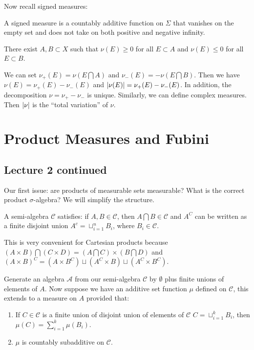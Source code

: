 \documentclass[10pt, twoside]{article}
\begin{document}
    Now recall signed measures:
    \begin{defn}
        A signed measure is a countably additive function on $\Sigma$ that vanishes on the empty set and does not take on both positive and negative infinity.
    \end{defn}

    \begin{lem}
        There exist $A,B \subset X$ such that $\nu(E) \geq 0$ for all $E \subset A$ and $\nu(E) \leq 0$ for all $E \subset B$.
    \end{lem}

    We can set $\nu_+(E) = \nu(E \bigcap A)$ and $\nu_-(E) = -\nu(E \bigcap B)$. Then we have $\nu(E) = \nu_+(E) - \nu_-(E)$ and $\lvert\nu(E)\rvert = \nu_+(E) - \nu_-(E)$. In addition, the decomposition $\nu = \nu_+ - \nu_-$ is unique. Similarly, we can define complex measures. Then $\lvert\nu\rvert$ is the ``total variation'' of $\nu$.

    \section{Product Measures and Fubini}%
    
    \subsection{Lecture 2 continued}%
    Our first issue: are products of measurable sets measurable? What is the correct product $\sigma$-algebra? We will simplify the structure.

    \begin{defn}
        A semi-algebra $\mathcal{C}$ satisfies: if $A,B \in \mathcal{C}$, then $A \bigcap B \in \mathcal{C}$ and $A^C$ can be written as a finite disjoint union $A^c = \sqcup_{i=1}^n B_i$, where $B_i \in \mathcal{C}$.
    \end{defn}
    
    This is very convenient for Cartesian products because $( A \times B ) \bigcap (C \times D) = (A \bigcap C) \times (B \bigcap D) $ and $(A \times B)^C = (A \times B^C) \sqcup (A^C \times B) \sqcup (A^C \times B^C)$.

    Generate an algebra $\mathcal{A}$ from our semi-algebra $\mathcal{C}$ by $\emptyset$ plus finite unions of elements of $A$. Now suppose we have an additive set function $\mu$ defined on $\mathcal{C}$, this extends to a measure on $A$ provided that:

    \begin{enumerate}
        \item If $C \in \mathcal{C}$ is a finite union of disjoint union of elements of $\mathcal{C}$ $C = \sqcup_{i=1}^k B_i$, then $\mu(C) = \sum_{i=1}^k \mu(B_i)$.
        \item $\mu$ is countably subadditive on $\mathcal{C}$.
    \end{enumerate}
\end{document}
